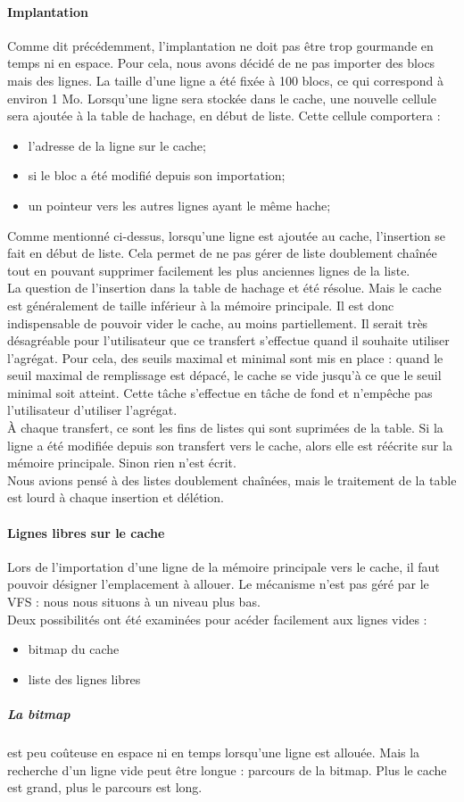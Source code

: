 \documentclass[a4paper,10pt]{article}
\begin{document}
\paragraph{Implantation}
Comme dit précédemment, l'implantation ne doit pas être trop gourmande en temps ni en espace. Pour cela, nous avons décidé de ne pas importer des blocs mais 
des lignes. La taille d'une ligne a été fixée à 100 blocs, ce qui correspond à environ 1 Mo. Lorsqu'une ligne sera stockée dans le cache, une nouvelle cellule 
sera ajoutée à la table de hachage, en début de liste. Cette cellule comportera : 
\begin{itemize}
 \item l'adresse de la ligne sur le cache;
 \item si le bloc a été modifié depuis son importation;
 \item un pointeur vers les autres lignes ayant le même hache;
\end{itemize}
Comme mentionné ci-dessus, lorsqu'une ligne est ajoutée au cache, l'insertion se fait en début de liste. Cela permet de ne pas gérer de liste doublement chaînée 
tout en pouvant supprimer facilement les plus anciennes lignes de la liste.\medskip\\
La question de l'insertion dans la table de hachage et été résolue. Mais le cache est généralement de taille inférieur à la mémoire principale. Il est donc 
indispensable de pouvoir vider le cache, au moins partiellement. Il serait très désagréable pour l'utilisateur que ce transfert s'effectue quand il 
souhaite utiliser l'agrégat. Pour cela, des seuils maximal et minimal sont mis en place : quand le seuil maximal de remplissage est dépacé, le cache se vide 
jusqu'à ce que le seuil minimal soit atteint. Cette tâche s'effectue en tâche de fond et n'empêche pas l'utilisateur d'utiliser l'agrégat.\\
À chaque transfert, ce sont les fins de listes qui sont suprimées de la table. Si la ligne a été modifiée depuis son transfert vers le cache, alors elle est 
réécrite sur la mémoire principale. Sinon rien n'est écrit.\medskip\\
Nous avions pensé à des listes doublement chaînées, mais le traitement de la table est lourd à chaque insertion et délétion.

\paragraph{Lignes libres sur le cache} 
Lors de l'importation d'une ligne de la mémoire principale vers le cache, il faut pouvoir désigner l'emplacement à allouer. Le mécanisme n'est pas géré par 
le VFS : nous nous situons à un niveau plus bas.\\
Deux possibilités ont été examinées pour acéder facilement aux lignes vides : 
\begin{itemize}
 \item bitmap du cache
 \item liste des lignes libres
\end{itemize}
\subparagraph{La bitmap} est peu coûteuse en espace ni en temps lorsqu'une ligne est allouée. Mais la recherche d'un ligne vide peut être longue : parcours de 
la bitmap. Plus le cache est grand, plus le parcours est long.
\end{document}
